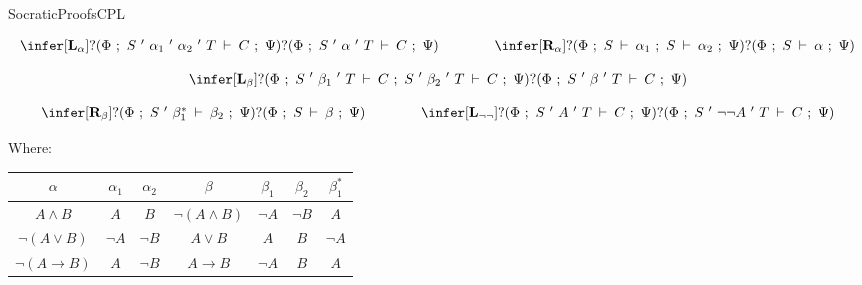 \begin{entry}{SocraticProofsCPL}  

\begin{calculus}

\[
\begin{array}{ccc}

\infer[\textbf{L}_\alpha]{?(\Phi ~;~  S ~'~ \alpha_{1} ~'~ \alpha_{2} ~'~ T\:\vdash\:C ~;~ \Psi)}{?(\Phi ~;~ S ~'~ \alpha ~'~ T\:\vdash\: C ~;~ \Psi)}

&~~~~~~&

\infer[\textbf{R}_{\alpha}]{?(\Phi ~;~  S\:\vdash\:\alpha_{1} ~;~ S\:\vdash\: \alpha_{2} ~;~ \Psi)}{?(\Phi ~;~ S\:\vdash\: \alpha ~;~ \Psi)}

\\
\end{array}
\]

$$
\infer[\textbf{L}_{\beta}]{?(\Phi ~;~  S ~'~ \beta_{1} ~'~ T\:\vdash\: C ~;~ S ~'~ \beta_{2} ~'~ T\:\vdash\: C ~;~ \Psi)}{?(\Phi ~;~ S ~'~ \beta ~'~ T\:\vdash\: C ~;~ \Psi)}
$$

\[
\begin{array}{ccc}

\infer[\textbf{R}_{\beta}]{?(\Phi ~;~  S ~'~ \beta^{*}_{1}\:\vdash\:\beta_{2} ~;~ \Psi)}{?(\Phi ~;~    S\:\vdash\:\beta ~;~ \Psi)}

&~~~~~~&

\infer[\textbf{L}_{\lnot \lnot}]{?(\Phi ~;~  S ~'~ A ~'~ T\:\vdash\: C ~;~ \Psi)}{?(\Phi ~;~  S ~'~ \lnot \lnot A ~'~ T\:\vdash\: C ~;~ \Psi)}

\\
\end{array}
\]

Where:

\begin{center}
	\begin{tabular}{ccc|cccc}
			\hline 
		$\alpha$ & $\alpha_{1}$ & $\alpha_{2}$ & $\beta$ & $\beta_{1}$ & $\beta_{2}$ & $\beta^{*}_{1}$  \\ 
			\hline
		$\textit{A}\wedge B$ & $\textit{A}$ & $\textit{B}$ & $\neg(A\wedge B)$ & $\neg A$ & $\neg B$ & $A$ \\
			
		$\neg(A\vee B)$ & $\neg A$ & $\neg B$ & $\textit{A}\vee B$ & $\textit{A}$ & $\textit{B}$ & $\neg A$ \\
			
		$\neg(A \rightarrow B)$ & $\textit{A}$ & $\neg B$ & $\textit{A} \rightarrow B$ & $\neg A$ & $\textit{B}$ & $A$ \\
	\end{tabular}
\end{center}


\end{calculus}
\end{entry}
